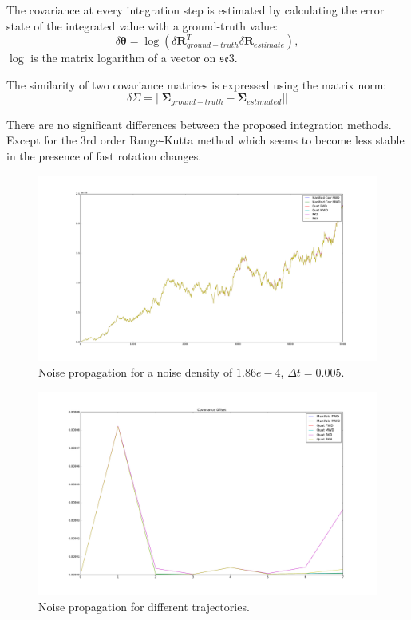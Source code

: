 \documentclass[10pt,a4paper]{article}
\newcommand{\mbs}[1]{{\boldsymbol{#1}}}
\numberwithin{equation}{section}
\begin{document}
The covariance at every integration step is estimated by calculating the error state of the integrated value with a ground-truth value:
\begin{equation}
\delta \mbs \theta = \log \left( \delta \mbs R_{ground-truth}^T \delta \mbs R_{estimate} \right),
\end{equation}
$\log$ is the matrix logarithm of a vector on $\mathfrak{se}3$.

The similarity of two covariance matrices is expressed using the matrix norm:
\begin{equation}
\delta \Sigma = || \mbs \Sigma_{ground-truth} - \mbs \Sigma_{estimated} ||
\end{equation}

There are no significant differences between the proposed integration methods. Except for the $3$rd order Runge-Kutta method which seems to become less stable in the presence of fast rotation changes.

\begin{figure}
\includegraphics[width=14cm]{figures/covariance_offset.pdf}
\caption{Noise propagation for a noise density of $1.86e-4$, $\Delta t = 0.005$. }
\label{fig:covariance_propagation}
\end{figure}	

\begin{figure}
\includegraphics[width=14cm]{figures/covariance_offset_methods.pdf}
\caption{Noise propagation for different trajectories.}
\label{fig:covariance_propagation_offsets}
\end{figure}	
\end{document}
